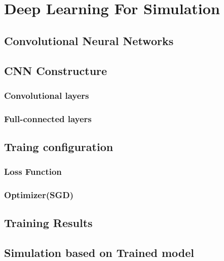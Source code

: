\chapter{Deep Learning For Simulation}


\section{Convolutional Neural Networks}

\section{CNN Constructure}
    \subsection{Convolutional layers}

    \subsection{Full-connected layers}

\section{Traing configuration}
    \subsection{Loss Function}

    \subsection{Optimizer(SGD)}

\section{Training Results}

\section{Simulation based on Trained model}